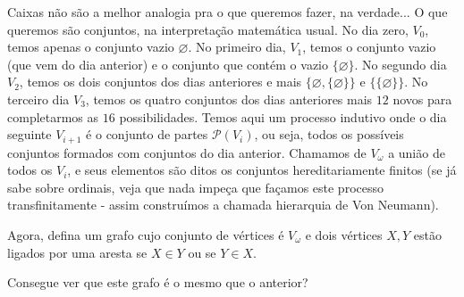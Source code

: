\documentclass[11pt]{article}
\theoremstyle{definition}
\theoremstyle{definition}
\theoremstyle{definition}
\theoremstyle{definition}
\theoremstyle{definition}
\theoremstyle{definition}
\theoremstyle{definition}
\theoremstyle{definition}
\theoremstyle{definition}
\theoremstyle{definition}
\theoremstyle{definition}
\theoremstyle{definition}
\theoremstyle{definition}
\begin{document}
Caixas não são a melhor analogia pra o que queremos fazer, na verdade... O que queremos são conjuntos, na interpretação matemática usual. No dia zero, $V_0$, temos apenas o conjunto vazio $\varnothing$. No primeiro dia, $V_1$, temos o conjunto vazio (que vem do dia anterior) e o conjunto que contém o vazio $\{\varnothing\}$. No segundo dia $V_2$, temos os dois conjuntos dos dias anteriores e mais $\{\varnothing, \{\varnothing\}\}$ e $\{\{ \varnothing\}\}$. No terceiro dia $V_3$, temos os quatro conjuntos dos dias anteriores mais $12$ novos para completarmos as $16$ possibilidades. Temos aqui um processo indutivo onde o dia seguinte $V_{i+1}$ é o conjunto de partes $\mathcal{P}(V_i)$, ou seja, todos os possíveis conjuntos formados com conjuntos do dia anterior. Chamamos de $V_\omega$ a união de todos os $V_i$, e seus elementos são ditos os conjuntos hereditariamente finitos (se já sabe sobre ordinais, veja que nada impeça que façamos este processo transfinitamente - assim construímos a chamada hierarquia de Von Neumann).

Agora, defina um grafo cujo conjunto de vértices é $V_\omega$ e dois vértices $X,Y$ estão ligados por uma aresta se $X \in Y$ ou se $Y \in X$.

Consegue ver que este grafo é o mesmo que o anterior?
\end{document}
